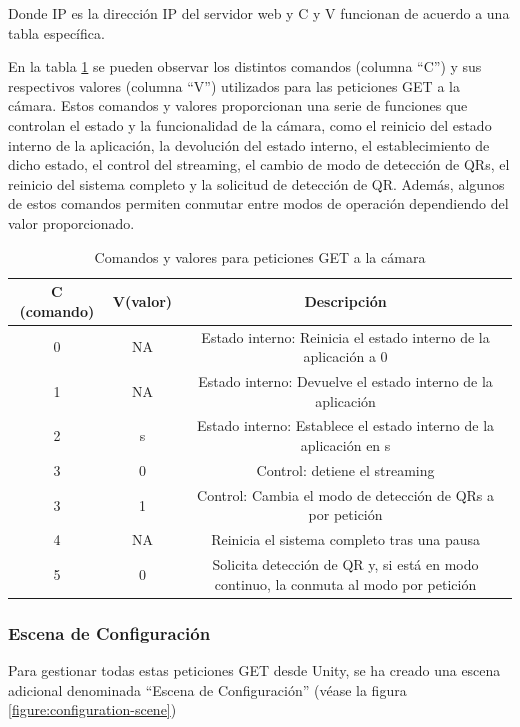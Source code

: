 Donde IP es la dirección IP del servidor web y C y V funcionan de acuerdo a una tabla específica.

En la tabla \ref{table:cam_commands} se pueden observar los distintos comandos (columna ``C'') y sus respectivos valores (columna ``V'') utilizados para las peticiones GET a la cámara. Estos comandos y valores proporcionan una serie de funciones que controlan el estado y la funcionalidad de la cámara, como el reinicio del estado interno de la aplicación, la devolución del estado interno, el establecimiento de dicho estado, el control del streaming, el cambio de modo de detección de QRs, el reinicio del sistema completo y la solicitud de detección de QR. Además, algunos de estos comandos permiten conmutar entre modos de operación dependiendo del valor proporcionado.

\begin{table}[!htb]
\begin{adjustbox}{width=\textwidth,center}
\begin{tabular}{|c|c|c|}
\hline
\textbf{C (comando)} & \textbf{V(valor)} & \textbf{Descripción} \\
\hline
0 & NA & Estado interno: Reinicia el estado interno de la aplicación a 0 \\
\hline
1 & NA & Estado interno: Devuelve el estado interno de la aplicación \\
\hline
2 & s & Estado interno: Establece el estado interno de la aplicación en s \\
\hline
3 & 0 & Control: detiene el streaming \\
\hline
3 & 1 & Control: Cambia el modo de detección de QRs a por petición \\
\hline
4 & NA & Reinicia el sistema completo tras una pausa \\
\hline
5 & 0 & Solicita detección de QR y, si está en modo continuo, la conmuta al modo por petición \\
\hline
\end{tabular}
\end{adjustbox}
\caption{Comandos y valores para peticiones GET a la cámara}
\label{table:cam_commands}
\end{table}

\subsubsection{Escena de Configuración}

Para gestionar todas estas peticiones GET desde Unity, se ha creado una escena adicional denominada ``Escena de Configuración'' (véase la figura \ref{figure:configuration-scene})

